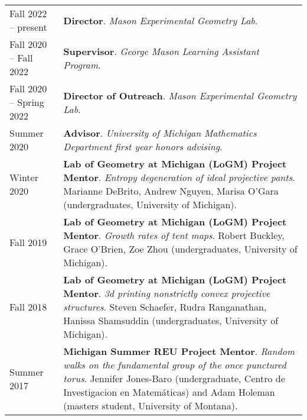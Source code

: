 
    \medskip


    \medskip
    
    \begin{center}
    {
    \renewcommand{\arraystretch}{1.5}
    \begin{longtable}{p{}  p{}}
      Fall 2022 --    present & \textbf{Director}. \textit{Mason Experimental Geometry Lab}.  \\ 
  Fall 2020 --   Fall 2022 & \textbf{Supervisor}. \textit{George Mason Learning Assistant Program}.  \\ 
  Fall 2020 --   Spring 2022 & \textbf{Director of Outreach}. \textit{Mason Experimental Geometry Lab}.  \\ 
  Summer 2020 & \textbf{Advisor}. \textit{University of Michigan Mathematics Department first year honors advising}.  \\ 
  Winter 2020 & \textbf{Lab of Geometry at Michigan (LoGM) Project Mentor}. \textit{Entropy degeneration of ideal projective pants}.  Marianne DeBrito, Andrew Nguyen, Marisa O'Gara (undergraduates, University of Michigan).  \\ 
  Fall 2019 & \textbf{Lab of Geometry at Michigan (LoGM) Project Mentor}. \textit{Growth rates of tent maps}.  Robert Buckley, Grace O'Brien, Zoe Zhou (undergraduates, University of Michigan).  \\ 
  Fall 2018 & \textbf{Lab of Geometry at Michigan (LoGM) Project Mentor}. \textit{3d printing nonstrictly convex projective structures}.  Steven Schaefer, Rudra Ranganathan, Hanissa Shamsuddin (undergraduates, University of Michigan).  \\ 
  Summer 2017 & \textbf{Michigan Summer REU  Project Mentor}. \textit{Random walks on the fundamental group of the once punctured torus}.  Jennifer Jones-Baro (undergraduate, Centro de Investigacion en Matem\'aticas) and Adam Holeman (masters student, University of Montana).  
    \end{longtable}
    } 
    \end{center}

    \vspace{-1em}
    